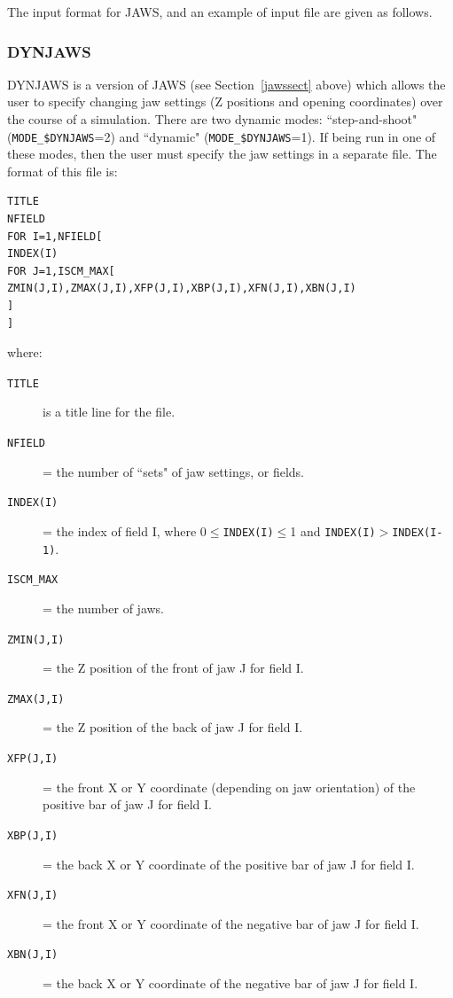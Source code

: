 \documentclass[12pt,twoside]{article}
\begin{document}
\clearpage

The input format for JAWS, and an example of input file are
given as follows.


\begin{small}

\end{small}


\clearpage
\vspace*{-1cm}
\subsubsection{DYNJAWS}
\label{dynjawssect}
\renewcommand{\rightmark}{DYNJAWS CM}

DYNJAWS is a version of JAWS (see Section~\ref{jawssect} above) which allows the
user to specify changing jaw settings (Z positions and opening coordinates)
over the course of a simulation.  There are two dynamic modes: ``step-and-shoot"
({\tt MODE\_\$DYNJAWS}=2) and ``dynamic"
({\tt MODE\_\$DYNJAWS}=1).  If being run in one of these modes, then the user must
specify the jaw settings in a separate file.  The format of this file is:
\begin{verbatim}
TITLE
NFIELD
FOR I=1,NFIELD[
INDEX(I)
FOR J=1,ISCM_MAX[
ZMIN(J,I),ZMAX(J,I),XFP(J,I),XBP(J,I),XFN(J,I),XBN(J,I)
]
]
\end{verbatim}
where:
\begin{description}
\item[{\tt TITLE}] is a title line for the file.
\item[{\tt NFIELD}] = the number of ``sets" of jaw settings, or fields.
\item[{\tt INDEX(I)}] = the index of field I, where 0$\leq${\tt INDEX(I)}$\leq$1 and
 {\tt INDEX(I)}$>${\tt INDEX(I-1)}.
\item[{\tt ISCM\_MAX}] = the number of jaws.
\item[{\tt ZMIN(J,I)}] = the Z position of the front of jaw J for field I.
\item[{\tt ZMAX(J,I)}] = the Z position of the back of jaw J for field I.
\item[{\tt XFP(J,I)}] = the front X or Y coordinate (depending on
jaw orientation) of the positive bar of jaw J for field I.
\item[{\tt XBP(J,I)}] = the back X or Y coordinate of the positive bar of jaw J
for field I.
\item[{\tt XFN(J,I)}] = the front X or Y coordinate of the negative bar of jaw J for field I.
\item[{\tt XBN(J,I)}] = the back X or Y coordinate of the negative bar of jaw J
for field I.
\end{description}
\end{document}
